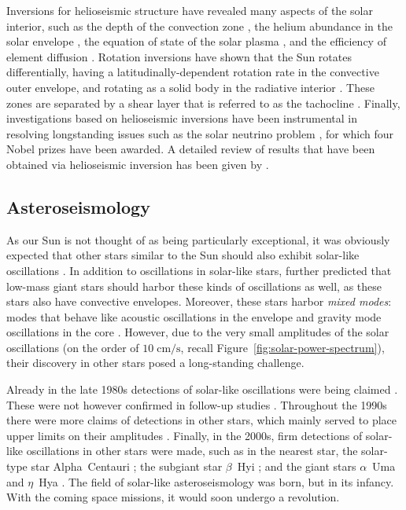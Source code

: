 Inversions for helioseismic structure have revealed many aspects of the solar interior, such as the depth of the convection zone \citep[e.g.,][]{1991ApJ...378..413C, 1997MNRAS.287..189B}, the helium abundance in the solar envelope \citep[e.g.,][]{1991LNP...388..111D, 1998MNRAS.298..719B}, the equation of state of the solar plasma \citep{1997A&A...322L...5B}, %
and the efficiency of element diffusion \citep{1993ApJ...403L..75C}. 
Rotation inversions have shown that the Sun rotates differentially, having a latitudinally-dependent rotation rate in the convective outer envelope, and rotating as a solid body in the radiative interior \citep[e.g.,][]{2009LRSP....6....1H}. 
These zones are separated by a shear layer that is referred to as the tachocline \citep[][]{1992A&A...265..106S}. 
Finally, investigations based on helioseismic inversions have been instrumental in resolving longstanding issues such as the solar neutrino problem \citep[e.g.,][]{1998PhLB..433....1B}, for which four Nobel prizes have been awarded. 
A detailed review of results that have been obtained via helioseismic inversion has been given by \citet{2016lrsp...13....2b}. 





\subsection{Asteroseismology}
As our Sun is not thought of as being particularly exceptional, it was obviously expected that other stars similar to the Sun should also exhibit solar-like oscillations \citep[e.g.,][]{1984srps.conf...11C}. 
In addition to oscillations in solar-like stars, \citet{1983SoPh...82..469C} further predicted that low-mass giant stars should harbor these kinds of oscillations as well, as these stars also have convective envelopes. %
Moreover, these stars harbor \emph{mixed modes}: modes that behave like acoustic oscillations in the envelope and gravity mode oscillations in the core \citep[e.g.,][]{2001MNRAS.328..601D}. 
However, due to the very small amplitudes of the solar oscillations (on the order of ${10\; \text{cm/s}}$, recall Figure~\ref{fig:solar-power-spectrum}), their discovery in other stars posed a long-standing challenge. 


Already in the late 1980s detections of solar-like oscillations were being claimed \citep{1986A&A...164..383G}. 
These were not however confirmed in follow-up studies \citep[e.g.,][]{1991MNRAS.249..643I}. 
Throughout the 1990s there were more claims of detections in other stars, which mainly served to place upper limits on their amplitudes \citep[e.g.,][]{1990ApJ...350..839B, 1991ApJ...368..599B, 1992A&A...264..138P, 1995MNRAS.276.1295E}. 
Finally, in the 2000s, firm detections of solar-like oscillations in other stars were made, such as in the nearest star, the solar-type star Alpha~Centauri \citep{2001A&A...374L...5B}; 
the subgiant star $\beta$~Hyi \citep{2001ApJ...549L.105B}; 
and the giant stars $\alpha$~Uma \citep{2000ApJ...532L.133B} and $\eta$~Hya \citep{2002A&A...394L...5F}. 
The field of solar-like asteroseismology was born, but in its infancy. 
With the coming space missions, it would soon undergo a revolution. 




